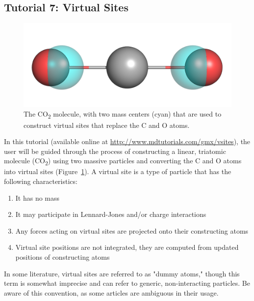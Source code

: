 \documentclass[9pt,tutorial,pubversion]{livecoms}
\newcommand{\urlstring}{http://www.mdtutorials.com/gmx}
\newcommand{\tutorialvsite}{\url{\urlstring/vsites}}
\begin{document}
\subsection{Tutorial 7: Virtual Sites} \label{vsite}

\begin{figure}[h]
\centering
\includegraphics{vsites_co2}
\caption{The CO\textsubscript{2} molecule, with two mass centers (cyan) that are used to construct virtual sites that replace the C and O atoms.}
\label{vsites_co2_fig}
\end{figure}

In this tutorial (available online at \tutorialvsite), the user will be guided through the process of constructing a linear, triatomic molecule (CO\textsubscript{2}) using two massive particles and converting the C and O atoms into virtual sites (Figure~\ref{vsites_co2_fig}). A virtual site is a type of particle that has the following characteristics:

\begin{enumerate}
	\item It has no mass
	\item It may participate in Lennard-Jones and/or charge interactions
	\item Any forces acting on virtual sites are projected onto their constructing atoms
	\item Virtual site positions are not integrated, they are computed from updated positions of constructing atoms
\end{enumerate}

In some literature, virtual sites are referred to as "dummy atoms," though this term is somewhat imprecise and can refer to generic, non-interacting particles. Be aware of this convention, as some articles are ambiguous in their usage.
\end{document}
